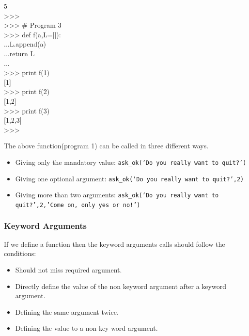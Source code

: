 \documentclass[12pt,a4paper]{article}
\begin{document}
{5\\ 
>>> \\
>>> \# Program 3\\
>>> def f(a,L=[]):\\
...\hspace{30pt}L.append(a)\\
...\hspace{30pt}return L\\
...\\
>>> print f(1)\\
{[1]}\\
>>> print f(2)\\
{[1,2]}\\
>>> print f(3)\\
{[1,2,3]}\\
>>>\\
}

The above function(program 1) can be called in three different ways.
\begin{itemize}
\item Giving only the mandatory value: \texttt{ask\_ok('Do you really want to quit?')}
\item Giving one optional argument: \texttt{ask\_ok('Do you really want to quit?',2)}
\item Giving more than two arguments: \texttt{ask\_ok('Do you really want to quit?',2,'Come on, only yes or no!')}
\end{itemize}


\subsubsection{Keyword Arguments}
If we define a function then the keyword arguments calls should follow the conditions:
\begin{itemize}
\item Should not miss required argument.
\item Directly define the value of the non keyword argument after a keyword argument.
\item Defining the same argument twice.
\item Defining the value to a non key word argument.
\end{itemize}
\end{document}
